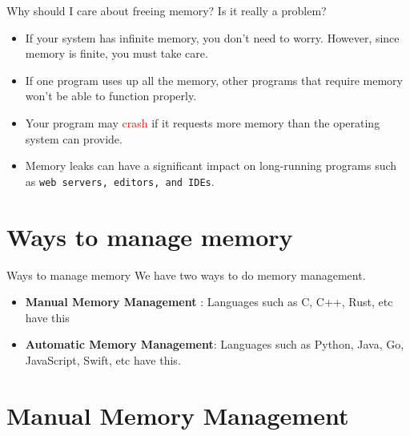 \documentclass[
  10pt,
  ignorenonframetext,
]{beamer}
\providecommand{\tightlist}{%
  \setlength{\itemsep}{0pt}\setlength{\parskip}{0pt}}
\begin{document}
\begin{frame}{Why should I care about freeing
memory? Is it really a problem?}
\protect\hypertarget{why-should-i-care-about-freeing-memory-is-it-really-a-problem}{}
\begin{itemize}
\tightlist
\item
  If your system has infinite memory, you don't
  need to worry. However, since memory is finite,
  you must take care. \pause
\item
  If one program uses up all the memory, other
  programs that require memory won't be able to
  function properly. \pause
\item
  Your program may \textcolor{red}{crash} if it
  requests more memory than the operating system
  can provide. \pause
\item
  Memory leaks can have a significant impact on
  long-running programs such as
  \texttt{web servers, editors, and IDEs}.
\end{itemize}
\end{frame}

\hypertarget{ways-to-manage-memory}{%
\section{Ways to manage
memory}\label{ways-to-manage-memory}}

\begin{frame}{Ways to manage memory}
We have two ways to do memory management.

\pause

\begin{itemize}
\item
  \textbf{Manual Memory Management} : Languages
  such as C, C++, Rust, etc have this
\item
  \textbf{Automatic Memory Management}: Languages
  such as Python, Java, Go, JavaScript, Swift, etc
  have this.
\end{itemize}
\end{frame}

\hypertarget{manual-memory-management}{%
\section{Manual Memory
Management}\label{manual-memory-management}}
\end{document}
